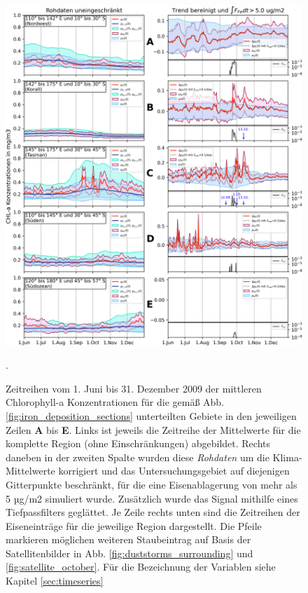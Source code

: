 \documentclass[12pt,a4paper,onecolumn,headheight=30pt]{scrartcl}
\begin{document}
\begin{figure}[htbp]
\includegraphics[width=\textwidth]{bilder/timeseries_all.png}
\caption{Zeitreihen vom 1. Juni bis 31. Dezember 2009 der mittleren Chlorophyll-a Konzentrationen für die gemäß Abb. \ref{fig:iron_deposition_sections} unterteilten Gebiete in den jeweiligen Zeilen \textbf{A} bis \textbf{E}. Links ist jeweils die Zeitreihe der Mittelwerte für die komplette Region (ohne Einschränkungen) abgebildet. Rechts daneben in der zweiten Spalte wurden diese \textit{Rohdaten} um die Klima-Mittelwerte korrigiert und das Untersuchungsgebiet auf diejenigen Gitterpunkte beschränkt, für die eine Eisenablagerung von mehr als 5 µg/m2 simuliert wurde. Zusätzlich wurde das Signal mithilfe eines Tiefpassfilters geglättet. Je Zeile rechts unten sind die Zeitreihen der Eiseneinträge für die jeweilige Region dargestellt. Die Pfeile markieren möglichen weiteren Staubeintrag auf Basis der Satellitenbilder in Abb. \ref{fig:duststorms_surrounding} und \ref{fig:satellite_october}. Für die Bezeichnung der Variablen siehe Kapitel \ref{sec:timeseries}}. \label{fig:timeseries_full}
\end{figure}
\end{document}
